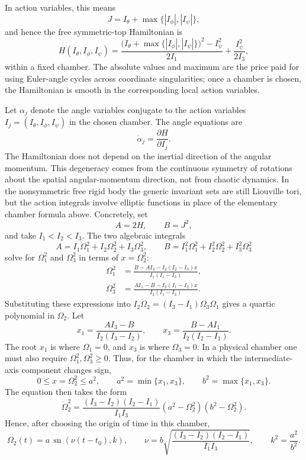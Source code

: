 In action variables, this means
\[
  J=I_\theta+\max\{|I_\phi|,|I_\psi|\},
\]
and hence the free symmetric-top Hamiltonian is
\[
  H(I_\theta,I_\phi,I_\psi)
  =
  \frac{
    \big(I_\theta+\max\{|I_\phi|,|I_\psi|\}\big)^2-I_\psi^2
  }{2I_1}
  +
  \frac{I_\psi^2}{2I_3},
\]
within a fixed chamber. The absolute values and maximum are the price paid for
using Euler-angle cycles across coordinate singularities; once a chamber is
chosen, the Hamiltonian is smooth in the corresponding local action variables.

Let \(\alpha_j\) denote the angle variables conjugate to the action variables
\(I_j=(I_\theta,I_\phi,I_\psi)\) in the chosen chamber. The angle equations are
\[
  \dot\alpha_j=\frac{\partial H}{\partial I_j}.
\]
The Hamiltonian does not depend on the inertial direction of the angular momentum. This
degeneracy comes from the continuous symmetry of rotations about the spatial
angular-momentum direction, not from chaotic dynamics. In the nonsymmetric free
rigid body the generic invariant sets are still Liouville tori, but the action
integrals involve elliptic functions in place of the elementary chamber formula
above. Concretely, set
\[
  A=2H,\qquad B=J^2,
\]
and take \(I_1<I_2<I_3\). The two algebraic integrals
\[
  A=I_1\Omega_1^2+I_2\Omega_2^2+I_3\Omega_3^2,\qquad
  B=I_1^2\Omega_1^2+I_2^2\Omega_2^2+I_3^2\Omega_3^2
\]
solve for \(\Omega_1^2\) and \(\Omega_3^2\) in terms of
\(x=\Omega_2^2\):
\[
\begin{aligned}
  \Omega_1^2
  &=
  \frac{B-AI_3-I_2(I_2-I_3)x}{I_1(I_1-I_3)},\\
  \Omega_3^2
  &=
  \frac{AI_1-B-I_2(I_1-I_2)x}{I_3(I_1-I_3)}.
\end{aligned}
\]
Substituting these expressions into
\(I_2\dot\Omega_2=(I_3-I_1)\Omega_3\Omega_1\) gives a quartic polynomial in
\(\Omega_2\). Let
\[
  x_1=\frac{AI_3-B}{I_2(I_3-I_2)},
  \qquad
  x_3=\frac{B-AI_1}{I_2(I_2-I_1)}.
\]
The root \(x_1\) is where \(\Omega_1=0\), and \(x_3\) is where
\(\Omega_3=0\). In a physical chamber one must also require
\(\Omega_1^2,\Omega_3^2\ge0\). Thus, for the chamber in which the
intermediate-axis component changes sign,
\[
  0\le x=\Omega_2^2\le a^2,
  \qquad
  a^2=\min\{x_1,x_3\},
  \qquad
  b^2=\max\{x_1,x_3\}.
\]
The equation then takes the form
\[
  \dot\Omega_2^2
  =
  \frac{(I_3-I_2)(I_2-I_1)}{I_1I_3}
  (a^2-\Omega_2^2)(b^2-\Omega_2^2).
\]
Hence, after choosing the origin of time in this chamber,
\[
  \boxed{
  \Omega_2(t)=a\,\operatorname{sn}(\nu(t-t_0),k),
  }
  \qquad
  \nu=b\sqrt{\frac{(I_3-I_2)(I_2-I_1)}{I_1I_3}},
  \qquad
  k^2=\frac{a^2}{b^2}.
\]
